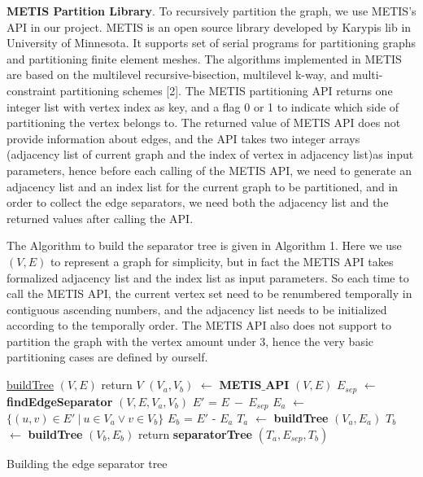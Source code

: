 \documentclass[12pt,glossary]{dalthesis}
\begin{document}
\textbf{METIS Partition Library}. To recursively partition the graph, we use METIS's API in our project. METIS is an open source library developed by Karypis lib in University of Minnesota. It supports set of serial programs for partitioning graphs and partitioning finite element meshes. The algorithms implemented in METIS are based on the multilevel recursive-bisection, multilevel k-way, and multi-constraint partitioning schemes [2]. The METIS partitioning API returns one integer list with vertex index as key, and a flag 0 or 1 to indicate which side of partitioning the vertex belongs to. The returned value of METIS API does not provide information about edges, and the API takes two integer arrays (adjacency list of current graph and the index of vertex in adjacency list)as input parameters, hence before each calling of the METIS API, we need to generate an adjacency list and an index list for the current graph to be partitioned, and in order to collect the edge separators, we need both the adjacency list and the returned values after calling the API.

\bigskip
\bigskip

The Algorithm to build the separator tree is given in Algorithm 1. Here we use $(V,E)$
to represent a graph for simplicity, but in fact the METIS API takes formalized adjacency list and the index list as input parameters. So each time to call the METIS API, the current vertex set need to be renumbered temporally in contiguous ascending numbers, and the adjacency list needs to be initialized according to the temporally order. The METIS API also does not support to partition the graph with the vertex amount under 3, hence the very basic partitioning cases are defined by ourself.

\bigskip

\begin{algorithm}
    \underline{buildTree} $(V,E)$\;
      {
        return $V$\;
      }
      {
      	$(V_{a},V_{b})$ $\leftarrow$ \textbf{METIS$\_$API} $(V,E)$  \;
		$E_{sep}$ $\leftarrow$ \textbf{findEdgeSeparator} $(V,E,V_{a},V_{b})$ \;
		$E'$ = $E \  - \ E_{sep}$   \;
      	$E_{a}$ $\leftarrow$ $\{ (u,v) \in E' \ | \  u\in V_{a} \vee v \in V_{b} \}$ \;
		$E_{b}$ = $E'$ - $E_{a}$ \;
		$T_{a}$ $\leftarrow$ \textbf{buildTree} $(V_{a},E_{a})$ \;
		$T_{b}$ $\leftarrow$ \textbf{buildTree} $(V_{b},E_{b})$ \;  
        return \textbf{separatorTree} $(T_{a}, E_{sep}, T_{b})$ \; 
      }
    \caption{Building the edge separator tree}
\end{algorithm}
\bigskip
\end{document}
